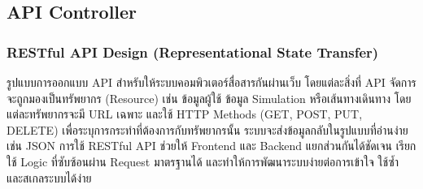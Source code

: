 \subsection{API Controller}



\subsubsection{RESTful API Design (Representational State Transfer)}
\indent รูปแบบการออกแบบ API สำหรับให้ระบบคอมพิวเตอร์สื่อสารกันผ่านเว็บ 
โดยแต่ละสิ่งที่ API จัดการจะถูกมองเป็นทรัพยากร (Resource) 
เช่น ข้อมูลผู้ใช้ ข้อมูล Simulation หรือเส้นทางเดินทาง โดยแต่ละทรัพยากรจะมี URL เฉพาะ 
และใช้ HTTP Methods (GET, POST, PUT, DELETE) เพื่อระบุการกระทำที่ต้องการกับทรัพยากรนั้น 
ระบบจะส่งข้อมูลกลับในรูปแบบที่อ่านง่าย เช่น JSON การใช้ RESTful API ช่วยให้ Frontend 
และ Backend แยกส่วนกันได้ชัดเจน เรียกใช้ Logic ที่ซับซ้อนผ่าน Request มาตรฐานได้ 
และทำให้การพัฒนาระบบง่ายต่อการเข้าใจ ใช้ซ้ำ และสเกลระบบได้ง่าย


